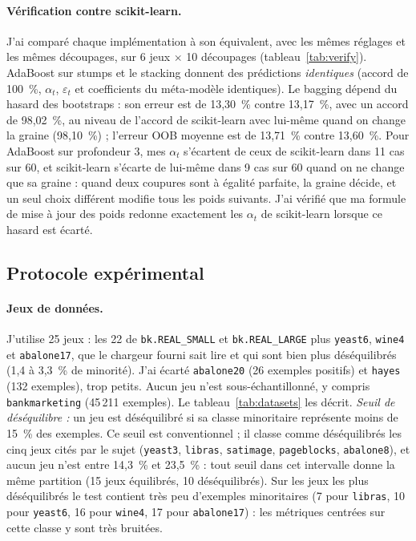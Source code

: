 \documentclass[11pt,a4paper]{article}
\begin{document}
\paragraph{Vérification contre scikit-learn.} J'ai comparé chaque implémentation à son équivalent, avec les mêmes réglages et les mêmes découpages, sur 6 jeux $\times$ 10 découpages (tableau~\ref{tab:verify}). AdaBoost sur stumps
et le stacking donnent des prédictions \emph{identiques} (accord de 100~\%, $\alpha_t$, $\varepsilon_t$ et coefficients du méta-modèle identiques). Le bagging dépend du hasard des bootstraps : son erreur est de 13,30~\% contre 13,17~\%,
avec un accord de 98,02~\%, au niveau de l'accord de scikit-learn avec lui-même quand on change la graine (98,10~\%) ; l'erreur OOB moyenne est de 13,71~\% contre 13,60~\%.
Pour AdaBoost sur profondeur 3, mes $\alpha_t$ s'écartent de ceux de scikit-learn dans 11 cas sur 60, et scikit-learn s'écarte de lui-même dans 9 cas sur 60 quand on ne change que sa graine : quand deux coupures sont à égalité parfaite, la graine décide, et un seul choix
différent modifie tous les poids suivants. J'ai vérifié que ma formule de mise à jour des poids redonne exactement les $\alpha_t$ de scikit-learn lorsque ce hasard est écarté.


\subsection{Protocole expérimental}
\paragraph{Jeux de données.} J'utilise 25 jeux : les 22 de \texttt{bk.REAL\_SMALL} et \texttt{bk.REAL\_LARGE} plus \texttt{yeast6}, \texttt{wine4} et \texttt{abalone17}, que le chargeur fourni sait lire et qui sont bien plus déséquilibrés (1,4 à 3,3~\% de minorité).
J'ai écarté \texttt{abalone20} (26 exemples positifs) et \texttt{hayes} (132 exemples), trop petits. Aucun jeu n'est sous-échantillonné, y compris \texttt{bankmarketing} (45\,211 exemples). Le tableau~\ref{tab:datasets} les décrit.
\emph{Seuil de déséquilibre :} un jeu est déséquilibré si sa classe minoritaire représente moins de 15~\% des exemples. Ce seuil est conventionnel ; il classe comme déséquilibrés les cinq jeux cités par le sujet (\texttt{yeast3},
\texttt{libras}, \texttt{satimage}, \texttt{pageblocks}, \texttt{abalone8}), et aucun jeu n'est entre 14,3~\% et 23,5~\% : tout seuil dans cet intervalle donne la même partition (15 jeux équilibrés, 10 déséquilibrés). Sur les jeux les plus déséquilibrés le test contient très peu d'exemples
minoritaires (7 pour \texttt{libras}, 10 pour \texttt{yeast6}, 16 pour \texttt{wine4}, 17 pour \texttt{abalone17}) : les métriques centrées sur cette classe y sont très bruitées.

\end{document}
